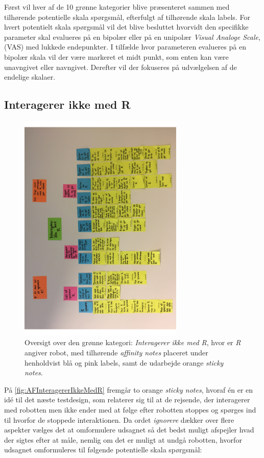 Først vil hver af de 10 grønne kategorier blive præsenteret sammen med tilhørende potentielle skala spørgsmål, efterfulgt af tilhørende skala labels. For hvert potentielt skala spørgsmål vil det blive besluttet hvorvidt den specifikke parameter skal evalueres på en bipolær eller på en unipolær \textit{Visual Analoge Scale}, (VAS) med lukkede endepunkter. I tilfælde hvor parameteren evalueres på en bipolær skala vil der være markeret et midt punkt, som enten kan være unavngivet eller navngivet. Derefter vil der fokuseres på udvælgelsen af de endelige skalaer.
\newpage 
%
\subsection{Interagerer ikke med R}
\label{ParametreInteragererIkkeMedR}
%
\begin{figure}[H]
\centering
\includegraphics[width = 0.7\textwidth, angle = -90]{Figure/AffinityDiagram/InteragererIkkeMedR} 
\caption{Oversigt over den grønne kategori: \textit{Interagerer ikke med R}, hvor er \textit{R} angiver robot, med tilhørende \textit{affinity notes} placeret under henholdvist blå og pink labels, samt de udarbejde orange \textit{sticky notes}.}
\label{fig:AFInteragererIkkeMedR}
\end{figure}
\noindent
%
På \autoref{fig:AFInteragererIkkeMedR} fremgår to orange \textit{sticky notes}, hvoraf én er en idé til det næste testdesign, som relaterer sig til at de rejsende, der interagerer med robotten men ikke ender med at følge efter robotten stoppes og spørges ind til hvorfor de stoppede interaktionen. Da ordet \textit{ignorere} dækker over flere aspekter vælges det at omformulere udsagnet så det bedst muligt afspejler hvad der sigtes efter at måle, nemlig om det er muligt at undgå robotten, hvorfor udsagnet omformuleres til følgende potentielle skala spørgsmål:\blankline 
